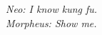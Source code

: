 \documentclass[
thesis.tex
]{subfiles}
\begin{document}
	\newpage
	\null
	\vfill

\begin{comment}
	
	\begin{flushright}
		\textit{To be yourself in a world that is constantly trying to \\ make you something else is the greatest accomplishment. \\ --- Ralph Waldo Emerson}
	\end{flushright}
	
	\begin{flushright}
		\textit{
			The reason anyone would do this, if they could, which they can't, \\ 
			would be because they could, which they can't. \\
			--- Pickle Rick}
	\end{flushright}
	
	\begin{flushright}
		\textsf{
			\textbf{
				THE CIRCLE IS NOW COMPLETE.\\
				\textit{
					--- Darth Vader
				}		
			}
		}
	\end{flushright}

\end{comment}
	
	\begin{flushright}
		
		\textit{
			Neo: I know kung fu. \\
			Morpheus: Show me.}
		
	\end{flushright}
	
	\vspace{4cm}
	
	\thispagestyle{empty}	
\end{document}
